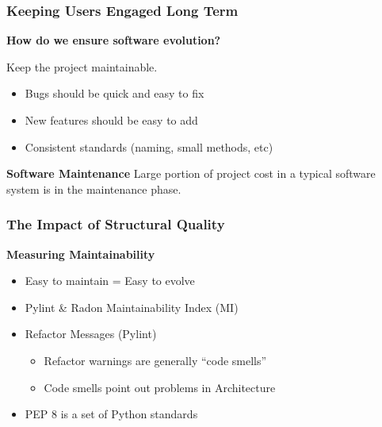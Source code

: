 \documentclass{beamer}
\begin{document}
\begin{frame}
  \frametitle{Keeping Users Engaged Long Term}
  \textbf{How do we ensure software evolution?}

  \vspace{0.35cm}
  Keep the project maintainable.
  \begin{itemize}
    \item Bugs should be quick and easy to fix
    \item New features should be easy to add
    \item Consistent standards (naming, small methods, etc)
  \end{itemize}

  \vspace{0.5cm}
  \textbf{Software Maintenance}
  \newline Large portion of project cost in a typical software system is in the maintenance phase.
\end{frame}

\begin{frame}
  \frametitle{The Impact of Structural Quality}
  \textbf{Measuring Maintainability}
  \begin{itemize}
    \vspace{0.35cm}
    \item Easy to maintain = Easy to evolve
    
    \vspace{0.35cm}
    \item Pylint \& Radon Maintainability Index (MI)
    
    \vspace{0.35cm}
    \item Refactor Messages (Pylint)
    \begin{itemize}
      \item Refactor warnings are generally ``code smells''
      \item Code smells point out problems in Architecture
    \end{itemize}

    \vspace{0.35cm}
    \item PEP 8 is a set of Python standards
  \end{itemize}
\end{frame}
\end{document}
